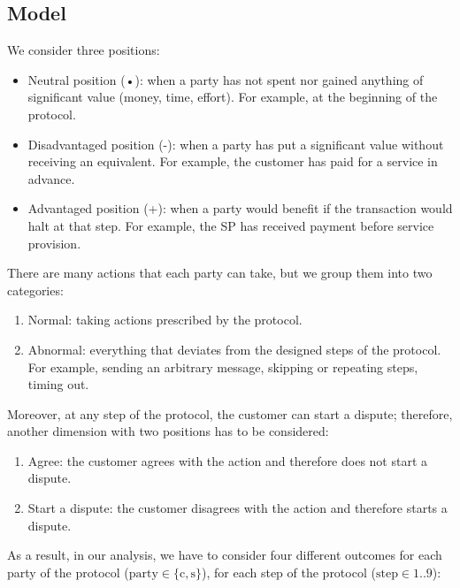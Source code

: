 \documentclass{ieeeaccess}
\begin{document}
\subsection{Model}\label{sec:fairness-model}
We consider three positions:

\begin{itemize}
\item Neutral position (•): when a party has not spent nor gained anything of significant value (money, time, effort). For example, at the beginning of the protocol.
\item Disadvantaged position (-): when a party has put a significant value without receiving an equivalent. For example, the customer has paid for a service in advance.
\item Advantaged position (+): when a party would benefit if the transaction would halt at that step. For example, the SP has received payment before service provision.
\end{itemize}

There are many actions that each party can take, but we group them into two categories:

\begin{enumerate}
\def\labelenumi{\arabic{enumi}.}

\item Normal: taking actions prescribed by the protocol.
\item Abnormal: everything that deviates from the designed steps of the protocol. For example, sending an arbitrary message, skipping or repeating steps, timing out.
\end{enumerate}

Moreover, at any step of the protocol, the customer can start a dispute; therefore, another dimension with two positions has to be considered:

\begin{enumerate}
\def\labelenumi{\arabic{enumi}.}

\item Agree: the customer agrees with the action and therefore does not start a dispute.
\item Start a dispute: the customer disagrees with the action and therefore starts a dispute.
\end{enumerate}

As a result, in our analysis, we have to consider four different outcomes for each party of the protocol ($\mathrm{party \in \{c, s}\}$), for each step of the protocol ($\mathrm{step \in 1..9}$):
\end{document}
